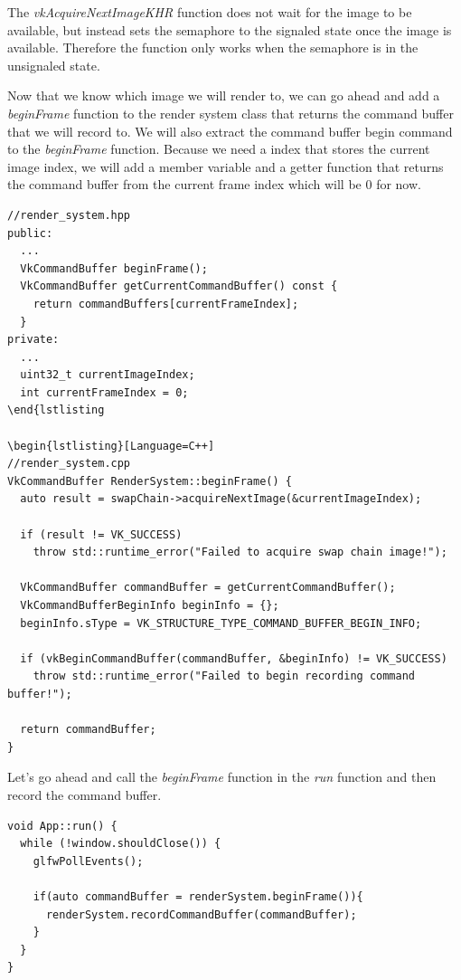 \documentclass[12pt]{report} \usepackage{preamble}
\begin{document}
The \textit{vkAcquireNextImageKHR} function does not wait for the image to be available, but instead sets the semaphore to the signaled state
once the image is available. Therefore the function only works when the semaphore is in the unsignaled state.

Now that we know which image we will render to, we can go ahead and add a \textit{beginFrame} function to the render system class that
returns the command buffer that we will record to. We will also extract the command buffer begin command to the \textit{beginFrame}
function. Because we need a index that stores the current image index, we will add a member variable
and a getter function that returns the command buffer from the current frame index which will be 0 for now.

\begin{lstlisting}[Language=C++]
//render_system.hpp
public:
  ...
  VkCommandBuffer beginFrame();
  VkCommandBuffer getCurrentCommandBuffer() const { 
    return commandBuffers[currentFrameIndex]; 
  }
private:
  ...
  uint32_t currentImageIndex;
  int currentFrameIndex = 0;
\end{lstlisting

\begin{lstlisting}[Language=C++]
//render_system.cpp
VkCommandBuffer RenderSystem::beginFrame() {
  auto result = swapChain->acquireNextImage(&currentImageIndex);

  if (result != VK_SUCCESS)
    throw std::runtime_error("Failed to acquire swap chain image!");

  VkCommandBuffer commandBuffer = getCurrentCommandBuffer();
  VkCommandBufferBeginInfo beginInfo = {};
  beginInfo.sType = VK_STRUCTURE_TYPE_COMMAND_BUFFER_BEGIN_INFO;

  if (vkBeginCommandBuffer(commandBuffer, &beginInfo) != VK_SUCCESS)
    throw std::runtime_error("Failed to begin recording command buffer!");

  return commandBuffer;
}
\end{lstlisting}

Let's go ahead and call the \textit{beginFrame} function in the \textit{run} function and then record the command buffer.

\begin{lstlisting}[Language=C++]
void App::run() {
  while (!window.shouldClose()) {
    glfwPollEvents();

    if(auto commandBuffer = renderSystem.beginFrame()){
      renderSystem.recordCommandBuffer(commandBuffer); 
    }
  }
}
\end{lstlisting}
\end{document}
